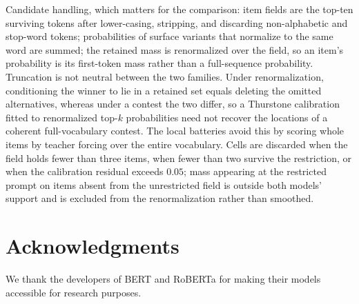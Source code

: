 \documentclass[11pt]{article}
\begin{document}
Candidate handling, which matters for the comparison: item fields are the
top-ten surviving tokens after lower-casing, stripping, and discarding
non-alphabetic and stop-word tokens; probabilities of surface variants that
normalize to the same word are summed; the retained mass is renormalized over
the field, so an item's probability is its first-token mass rather than a
full-sequence probability. Truncation is not neutral between the two
families. Under renormalization, conditioning the winner to lie in a retained
set equals deleting the omitted alternatives, whereas under a contest the two
differ, so a Thurstone calibration fitted to renormalized top-$k$
probabilities need not recover the locations of a coherent full-vocabulary
contest. The local batteries avoid this by scoring whole items by teacher
forcing over the entire vocabulary. Cells are discarded when the field holds
fewer than three items, when fewer than two survive the restriction, or when
the calibration residual exceeds $0.05$; mass appearing at the restricted
prompt on items absent from the unrestricted field is outside both models'
support and is excluded from the renormalization rather than smoothed.

\section*{Acknowledgments}
We thank the developers of BERT and RoBERTa for making their models
accessible for research purposes.
\end{document}
